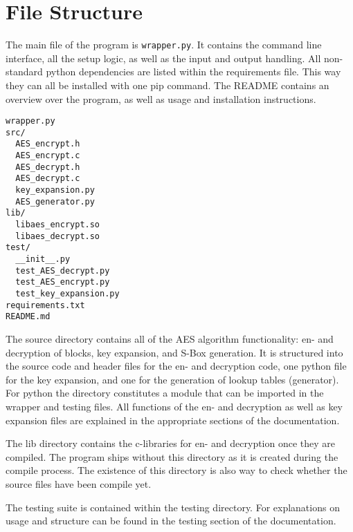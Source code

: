 \section{File Structure}
The main file of the program is \lstinline|wrapper.py|. It contains the command line interface, all the setup logic, as well as the input and output handling. All non-standard python dependencies are listed within the requirements file. This way they can all be installed with one pip command. The README contains an overview over the program, as well as usage and installation instructions.

\begin{lstlisting}
wrapper.py
src/
  AES_encrypt.h
  AES_encrypt.c
  AES_decrypt.h
  AES_decrypt.c
  key_expansion.py
  AES_generator.py
lib/
  libaes_encrypt.so
  libaes_decrypt.so
test/
  __init__.py
  test_AES_decrypt.py
  test_AES_encrypt.py
  test_key_expansion.py
requirements.txt
README.md
\end{lstlisting}

The source directory contains all of the AES algorithm functionality: en- and decryption of blocks, key expansion, and S-Box generation. It is structured into the source code and header files for the en- and decryption code, one python file for the key expansion, and one for the generation of lookup tables (generator). For python the directory constitutes a module that can be imported in the wrapper and testing files. All functions of the en- and decryption as well as key expansion files are explained in the appropriate sections of the documentation.

The lib directory contains the c-libraries for en- and decryption once they are compiled. The program ships without this directory as it is created during the compile process. The existence of this directory is also way to check whether the source files have been compile yet.

The testing suite is contained within the testing directory. For explanations on usage and structure can be found in the testing section of the documentation.
